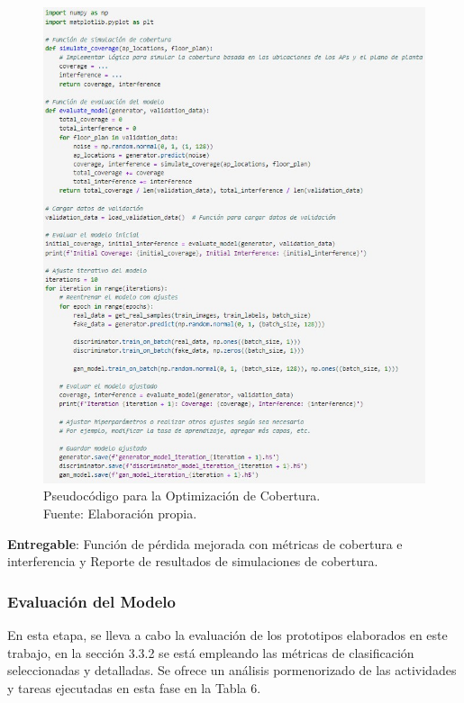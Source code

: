 \begin{figure}[H]
	\centering
	\includegraphics[width=1\textwidth]{3/figures/pseudo_cobert.jpg}
	\caption[Pseudocódigo para la Optimización de Cobertura]{Pseudocódigo para la Optimización de Cobertura.\\ Fuente: Elaboración propia.}
	\label{3:9}
\end{figure}

\textbf{Entregable}: Función de pérdida mejorada con métricas de cobertura e interferencia y Reporte de resultados de simulaciones de cobertura.

\subsubsection{Evaluación del Modelo}
En esta etapa, se lleva a cabo la evaluación de los prototipos elaborados en este trabajo, en la sección 3.3.2 se está empleando las métricas de clasificación seleccionadas y detalladas. Se ofrece un análisis pormenorizado de las actividades y tareas ejecutadas en esta fase en la Tabla 6.

